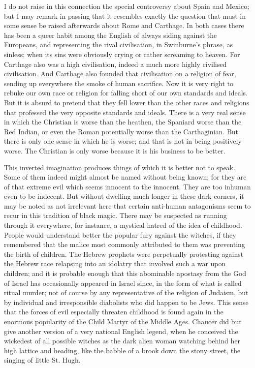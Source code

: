 I do not raise in this connection the special controversy about Spain and Mexico; but I may remark in passing that it resembles exactly the question that must in some sense be raised afterwards about Rome and Carthage. In both cases there has been a queer habit among the English of always siding against the Europeans, and representing the rival civilisation, in Swinburne's phrase, as sinless; when its sins were obviously crying or rather screaming to heaven. For Carthage also was a high civilisation, indeed a much more highly civilised civilisation. And Carthage also founded that civilisation on a religion of fear, sending up everywhere the smoke of human sacrifice. Now it is very right to rebuke our own race or religion for falling short of our own standards and ideals. But it is absurd to pretend that they fell lower than the other races and religions that professed the very opposite standards and ideals. There is a very real sense in which the Christian is worse than the heathen, the Spaniard worse than the Red Indian, or even the Roman potentially worse than the Carthaginian. But there is only one sense in which he is worse; and that is not in being positively worse. The Christian is only worse because it is his business to be better.

This inverted imagination produces things of which it is better not to speak. Some of them indeed might almost be named without being known; for they are of that extreme evil which seems innocent to the innocent. They are too inhuman even to be indecent. But without dwelling much longer in these dark corners, it may be noted as not irrelevant here that certain anti-human antagonisms seem to recur in this tradition of black magic. There may be suspected as running through it everywhere, for instance, a mystical hatred of the idea of childhood. People would understand better the popular fury against the witches, if they remembered that the malice most commonly attributed to them was preventing the birth of children. The Hebrew prophets were perpetually protesting against the Hebrew race relapsing into an idolatry that involved such a war upon children; and it is probable enough that this abominable apostasy from the God of Israel has occasionally appeared in Israel since, in the form of what is called ritual murder; not of course by any representative of the religion of Judaism, but by individual and irresponsible diabolists who did happen to be Jews. This sense that the forces of evil especially threaten childhood is found again in the enormous popularity of the Child Martyr of the Middle Ages. Chaucer did but give another version of a very national English legend, when he conceived the wickedest of all possible witches as the dark alien woman watching behind her high lattice and heading, like the babble of a brook down the stony street, the singing of little St. Hugh.

